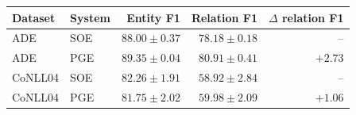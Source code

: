 \begin{tabular}{llrrr}
\toprule
Dataset & System & Entity F1 & Relation F1 & $\Delta$ relation F1 \\
\midrule
ADE & SOE & $88.00\pm0.37$ & $78.18\pm0.18$ & -- \\
ADE & PGE & $89.35\pm0.04$ & $80.91\pm0.41$ & $+2.73$ \\
CoNLL04 & SOE & $82.26\pm1.91$ & $58.92\pm2.84$ & -- \\
CoNLL04 & PGE & $81.75\pm2.02$ & $59.98\pm2.09$ & $+1.06$ \\
\bottomrule
\end{tabular}
